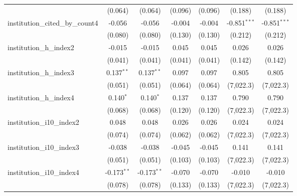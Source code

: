 \begin{tabular}{lcccccc}
                                         & (0.064)       & (0.064)       & (0.096)        & (0.096)        & (0.188)        & (0.188)\\   
   institution\_cited\_by\_count4        & -0.056        & -0.056        & -0.004         & -0.004         & -0.851$^{***}$ & -0.851$^{***}$\\   
                                         & (0.080)       & (0.080)       & (0.130)        & (0.130)        & (0.212)        & (0.212)\\   
   institution\_h\_index2                & -0.015        & -0.015        & 0.045          & 0.045          & 0.026          & 0.026\\   
                                         & (0.041)       & (0.041)       & (0.041)        & (0.041)        & (0.142)        & (0.142)\\   
   institution\_h\_index3                & 0.137$^{**}$  & 0.137$^{**}$  & 0.097          & 0.097          & 0.805          & 0.805\\   
                                         & (0.051)       & (0.051)       & (0.064)        & (0.064)        & (7,022.3)      & (7,022.3)\\   
   institution\_h\_index4                & 0.140$^{*}$   & 0.140$^{*}$   & 0.137          & 0.137          & 0.790          & 0.790\\   
                                         & (0.068)       & (0.068)       & (0.120)        & (0.120)        & (7,022.3)      & (7,022.3)\\   
   institution\_i10\_index2              & 0.048         & 0.048         & 0.026          & 0.026          & 0.024          & 0.024\\   
                                         & (0.074)       & (0.074)       & (0.062)        & (0.062)        & (7,022.3)      & (7,022.3)\\   
   institution\_i10\_index3              & -0.038        & -0.038        & -0.045         & -0.045         & 0.141          & 0.141\\   
                                         & (0.051)       & (0.051)       & (0.103)        & (0.103)        & (7,022.3)      & (7,022.3)\\   
   institution\_i10\_index4              & -0.173$^{**}$ & -0.173$^{**}$ & -0.070         & -0.070         & -0.010         & -0.010\\   
                                         & (0.078)       & (0.078)       & (0.133)        & (0.133)        & (7,022.3)      & (7,022.3)\\   

\end{tabular}
